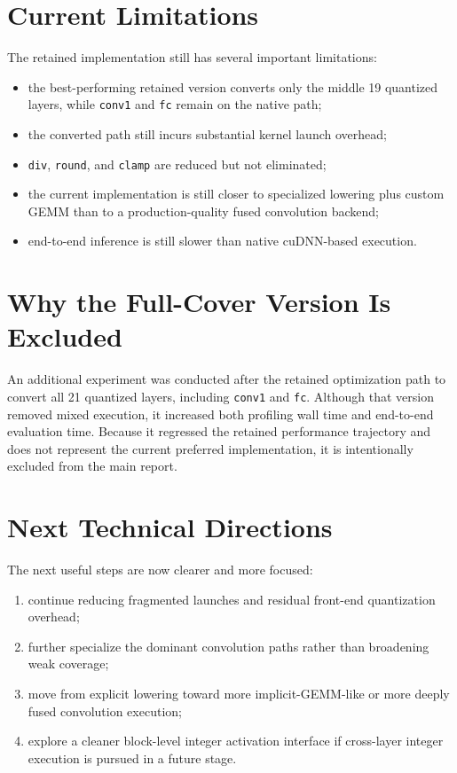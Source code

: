 \documentclass[11pt,a4paper]{article}
\begin{document}
\section{Current Limitations}
The retained implementation still has several important limitations:
\begin{itemize}
  \item the best-performing retained version converts only the middle 19 quantized layers, while \texttt{conv1} and \texttt{fc} remain on the native path;
  \item the converted path still incurs substantial kernel launch overhead;
  \item \texttt{div}, \texttt{round}, and \texttt{clamp} are reduced but not eliminated;
  \item the current implementation is still closer to specialized lowering plus custom GEMM than to a production-quality fused convolution backend;
  \item end-to-end inference is still slower than native cuDNN-based execution.
\end{itemize}

\section{Why the Full-Cover Version Is Excluded}
An additional experiment was conducted after the retained optimization path to convert all 21 quantized layers, including \texttt{conv1} and \texttt{fc}. Although that version removed mixed execution, it increased both profiling wall time and end-to-end evaluation time. Because it regressed the retained performance trajectory and does not represent the current preferred implementation, it is intentionally excluded from the main report.

\section{Next Technical Directions}
The next useful steps are now clearer and more focused:
\begin{enumerate}
  \item continue reducing fragmented launches and residual front-end quantization overhead;
  \item further specialize the dominant convolution paths rather than broadening weak coverage;
  \item move from explicit lowering toward more implicit-GEMM-like or more deeply fused convolution execution;
  \item explore a cleaner block-level integer activation interface if cross-layer integer execution is pursued in a future stage.
\end{enumerate}
\end{document}
